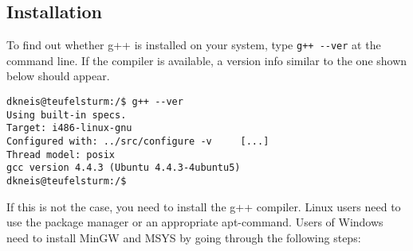 \subsection{Installation} \label{sec:extSoft:gpp:basic}

To find out whether g++ is installed on your system, type \verb!g++ --ver! at the command line. If the compiler is available, a version info similar to the one shown below should appear.

\begin{lstlisting}[style=shell]
dkneis@teufelsturm:/$ g++ --ver
Using built-in specs.
Target: i486-linux-gnu
Configured with: ../src/configure -v     [...]
Thread model: posix
gcc version 4.4.3 (Ubuntu 4.4.3-4ubuntu5)
dkneis@teufelsturm:/$
\end{lstlisting}

If this is not the case, you need to install the g++ compiler. Linux users need to use the package manager or an appropriate apt-command. Users of Windows need to install MinGW and MSYS by going through the following steps:

